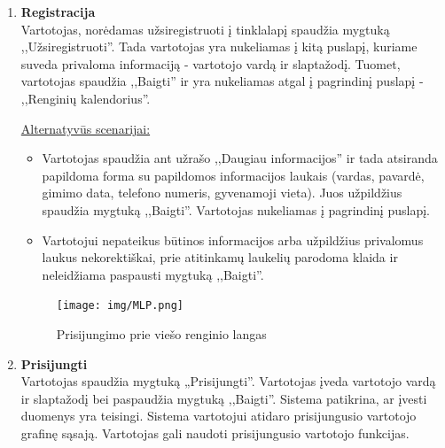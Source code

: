 \documentclass{VUMIFPSkursinis}
\begin{document}
\begin{enumerate} [label = \textbf{U\arabic*.}]
					\underline{Alternatyvūs scenarijai:}
					\begin{itemize}
						\item Vartotojas nėra prisijungęs ir privalo užpildyti elektroninio pašto lauką, nes kitaip negalima paspausti mygtuko ,,Baigta''.
					\end{itemize}

				\begin{figure}[H]
					\centering
					\texttt{[image: img/MLP.png]}
					\caption{Konkretaus renginio langas}
					\label{fig:konkretaus-renginio-langas}
				\end{figure}
				
			\item \textbf{Registracija} \\
					Vartotojas, norėdamas užsiregistruoti į tinklalapį spaudžia mygtuką ,,Užsiregistruoti''. Tada vartotojas yra nukeliamas į kitą puslapį, kuriame suveda privaloma informaciją - vartotojo vardą ir slaptažodį. Tuomet, vartotojas spaudžia ,,Baigti'' ir yra nukeliamas atgal į pagrindinį puslapį - ,,Renginių kalendorius''.
							
					\underline{Alternatyvūs scenarijai:}
					\begin{itemize}
						\item Vartotojas spaudžia ant užrašo ,,Daugiau informacijos'' ir tada atsiranda papildoma forma su papildomos informacijos laukais (vardas, pavardė, gimimo data, telefono numeris, gyvenamoji vieta). Juos užpildžius spaudžia mygtuką ,,Baigti''. Vartotojas nukeliamas į pagrindinį puslapį.
						\item Vartotojui nepateikus būtinos informacijos arba užpildžius privalomus laukus nekorektiškai, prie atitinkamų laukelių parodoma klaida ir neleidžiama paspausti mygtuką ,,Baigti''.
					\end{itemize}

				\begin{figure}[H]
					\centering
					\texttt{[image: img/MLP.png]}
					\caption{Prisijungimo prie viešo renginio langas}
					\label{fig:prisijungti-prie-vieso-renginio}
				\end{figure}

			\item \textbf{Prisijungti} \\
					Vartotojas spaudžia mygtuką „Prisijungti''. Vartotojas įveda vartotojo vardą ir slaptažodį bei paspaudžia mygtuką ,,Baigti''. Sistema patikrina, ar įvesti duomenys yra teisingi. Sistema vartotojui atidaro prisijungusio vartotojo grafinę sąsają. Vartotojas gali naudoti prisijungusio vartotojo funkcijas. 
					

\end{enumerate}
\end{document}
